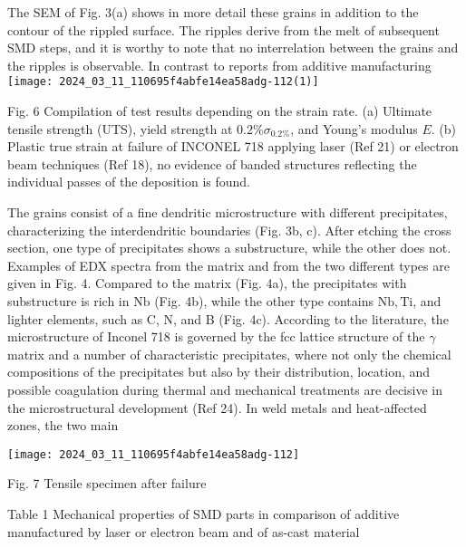 \documentclass[10pt]{article}
\begin{document}
The SEM of Fig. 3(a) shows in more detail these grains in addition to the contour of the rippled surface. The ripples derive from the melt of subsequent SMD steps, and it is worthy to note that no interrelation between the grains and the ripples is observable. In contrast to reports from additive manufacturing\\
\texttt{[image: 2024\_03\_11\_110695f4abfe14ea58adg-112(1)]}

Fig. 6 Compilation of test results depending on the strain rate. (a) Ultimate tensile strength (UTS), yield strength at $0.2 \% \sigma_{0.2 \%}$, and Young's modulus $E$. (b) Plastic true strain at failure of INCONEL 718 applying laser (Ref 21) or electron beam techniques (Ref 18), no evidence of banded structures reflecting the individual passes of the deposition is found.

The grains consist of a fine dendritic microstructure with different precipitates, characterizing the interdendritic boundaries (Fig. 3b, c). After etching the cross section, one type of precipitates shows a substructure, while the other does not. Examples of EDX spectra from the matrix and from the two different types are given in Fig. 4. Compared to the matrix (Fig. 4a), the precipitates with substructure is rich in $\mathrm{Nb}$ (Fig. 4b), while the other type contains $\mathrm{Nb}, \mathrm{Ti}$, and lighter elements, such as C, N, and B (Fig. 4c). According to the literature, the microstructure of Inconel 718 is governed by the fcc lattice structure of the $\gamma$ matrix and a number of characteristic precipitates, where not only the chemical compositions of the precipitates but also by their distribution, location, and possible coagulation during thermal and mechanical treatments are decisive in the microstructural development (Ref 24). In weld metals and heat-affected zones, the two main

\begin{center}
\texttt{[image: 2024\_03\_11\_110695f4abfe14ea58adg-112]}
\end{center}

Fig. 7 Tensile specimen after failure

Table 1 Mechanical properties of SMD parts in comparison of additive manufactured by laser or electron beam and of as-cast material
\end{document}
